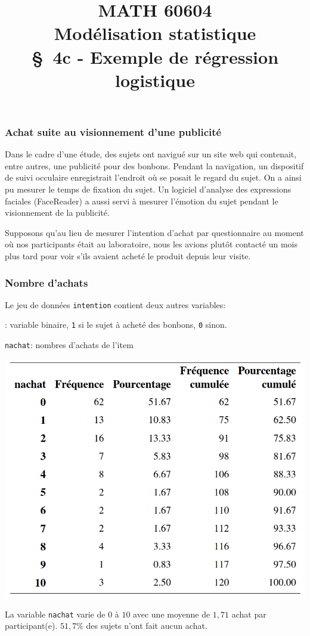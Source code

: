 \documentclass{beamer}
\title[\color{white}{MATH 60604 \S~4c - Exemple de régression logistique}]{\texorpdfstring{MATH 60604 \\Modélisation statistique \\ \S~4c - Exemple de régression logistique}{MATH 60604 \\Modélisation statistique \\ \S~4c - Exemple de régression logistique}}
\author{}
\institute{HEC Montréal\\
Département de sciences de la décision}
\date{}
\begin{document}
\frame{\titlepage}

\begin{frame}[fragile]
\frametitle{Achat suite au visionnement d'une publicité}

Dans le cadre d'une étude, des sujets ont navigué sur un site web
qui contenait, entre autres, une publicité pour des bonbons. Pendant la
navigation, un dispositif de suivi occulaire enregistrait l'endroit où se posait le regard du
sujet. On a ainsi pu mesurer le temps de fixation du sujet. Un logiciel d'analyse des expressions faciales (FaceReader) a aussi servi à mesurer l'émotion du sujet pendant le visionnement de la publicité.
 
\vp


Supposons qu'au lieu de mesurer l'intention d'achat par questionnaire au moment où nos participants était au laboratoire, \alert{nous les avions plutôt contacté un mois plus tard pour voir s'ils avaient acheté le produit depuis leur visite}.
\end{frame}
\begin{frame}
\frametitle{Nombre d'achats}
Le jeu de données \texttt{intention} contient deux autres variables:

\bi\item {}: variable binaire, \texttt{1} si le sujet à acheté des bonbons, \texttt{0} sinon.
\item \texttt{nachat}: nombres d'achats de l'item
\ei
\begin{center}
\includegraphics[width = 0.6\linewidth]{img/c4/diapos8-e2}
\end{center}
{\small 
La variable \texttt{nachat} varie de $0$ à $10$ avec une moyenne de $1,71$ achat par participant(e). $51,7$\% des sujets n'ont fait aucun achat.
}
\end{frame}
% 
\end{document}

